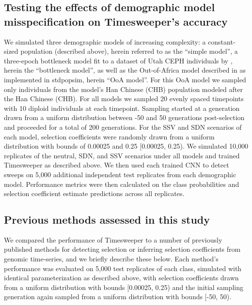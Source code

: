 \subsection{Testing the effects of demographic model misspecification on Timesweeper’s accuracy}

We simulated three demographic models of increasing complexity: a constant-sized population (described above), herein referred to as the “simple model”, a three-epoch bottleneck model fit to a dataset of Utah CEPH individuals by \cite{marthAlleleFrequencySpectrum2004}, herein the “bottleneck model”, as well as the Out-of-Africa model described in \cite{gutenkunstInferringJointDemographic2009} as implemented in stdpopsim, herein “OoA model”. For this OoA model we sampled only individuals from the model’s Han Chinese (CHB) population modeled after the Han Chinese (CHB). For all models we sampled 20 evenly spaced timepoints with 10 diploid individuals at each timepoint. Sampling started at a generation drawn from a uniform distribution between -50 and 50 generations post-selection and proceeded for a total of 200 generations. For the SSV and SDN scenarios of each model, selection coefficients were randomly drawn from a uniform distribution with bounds of 0.00025 and 0.25 [0.00025, 0.25). We simulated 10,000 replicates of the neutral, SDN, and SSV scenarios under all models and trained Timesweeper as described above. We then used each trained CNN to detect sweeps on 5,000 additional independent test replicates from each demographic model. Performance metrics were then calculated on the class probabilities and selection coefficient estimate predictions across all replicates. \\

\subsection{Previous methods assessed in this study} 

We compared the performance of Timesweeper to a number of previously published methods for detecting selection or inferring selection coefficients from genomic time-series, and we briefly describe these below. Each method’s performance was evaluated on 5,000 test replicates of each class, simulated with identical parameterization as described above, with selection coefficients drawn from a uniform distribution with bounds [0.00025, 0.25) and the initial sampling generation again sampled from a uniform distribution with bounds [-50, 50). \\

